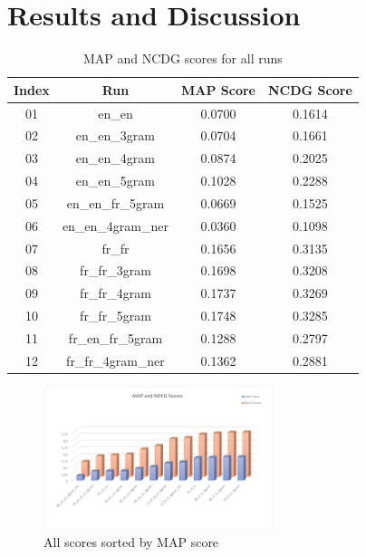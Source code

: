 \section{Results and Discussion}
\label{sec:results}
\begin{table}[h!]
    \begin{center}
        \caption{MAP and NCDG scores for all runs}
        \label{tab:all_scores}
        \begin{tabular}{|c|c||c|c|}
            \hline
            \textbf{Index} & \textbf{Run} & \textbf{MAP Score} & \textbf{NCDG Score}\\
            \hline\hline
            01 & en\_en & \cellcolor{red!30!white}0.0700 & \cellcolor{red!30!white}0.1614 \\
            \hline
            02 & en\_en\_3gram & 0.0704 & 0.1661 \\
            \hline
            03 & en\_en\_4gram & 0.0874 & 0.2025 \\
            \hline
            04 & en\_en\_5gram & 0.1028 & 0.2288 \\
            \hline
            05 & en\_en\_fr\_5gram & \cellcolor{red!60!white}0.0669 & \cellcolor{red!60!white}0.1525 \\
            \hline
            06 & en\_en\_4gram\_ner & \cellcolor{red}0.0360 & \cellcolor{red}0.1098 \\
            \hline
            07 & fr\_fr & 0.1656 & 0.3135 \\
            \hline
            08 & fr\_fr\_3gram & \cellcolor{green!30!white}0.1698 & \cellcolor{green!30!white}0.3208 \\
            \hline
            09 & fr\_fr\_4gram & \cellcolor{green!60!white}0.1737 & \cellcolor{green!60!white}0.3269 \\
            \hline
            10 & fr\_fr\_5gram & \cellcolor{green}0.1748 & \cellcolor{green}0.3285 \\
            \hline
            11 & fr\_en\_fr\_5gram & 0.1288 & 0.2797 \\
            \hline
            12 & fr\_fr\_4gram\_ner & 0.1362 & 0.2881 \\
            \hline
        \end{tabular}
    \end{center}
\end{table}

\begin{figure}[h!]
    \centering
    \includegraphics[width=0.6\textwidth]{figure/allScores}
    \caption{All scores sorted by MAP score}
    \label{fig:sorted_scores}
\end{figure}

